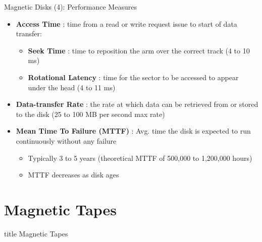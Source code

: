 \documentclass[aspectratio=169, xcolor=dvipsnames]{beamer}
\begin{document}
\begin{frame}{Magnetic Disks (4): Performance Measures}
    \begin{block}{}
        \begin{itemize}[<+->]
            \item \textbf{Access Time} : time from a read or write request issue to start of data transfer:
            \begin{itemize}[<+->]
                \item \textbf{Seek Time} : time to reposition the arm over the correct track (4 to 10 ms)
                \item \textbf{Rotational Latency} : time for the sector to be accessed to appear under the head (4 to 11 ms)
            \end{itemize}
            \item \textbf{Data-transfer Rate} : the rate at which data can be retrieved from or stored to the disk (25 to 100 MB per second max rate)
            \item \textbf{Mean Time To Failure (MTTF)} : Avg. time the disk is expected to run continuously without any failure
            \begin{itemize}[<+->]
                \item Typically 3 to 5 years (theoretical MTTF of 500,000 to 1,200,000 hours)
                \item MTTF decreases as disk ages
            \end{itemize}
        \end{itemize}
    \end{block}
\end{frame}

\section{Magnetic Tapes}

\begin{frame}
  \vfill
  \centering
  \begin{beamercolorbox}[sep=8pt,center,shadow=true,rounded=true]{title}
    Magnetic Tapes\par%
  \end{beamercolorbox}
  \vfill
\end{frame}
\end{document}
